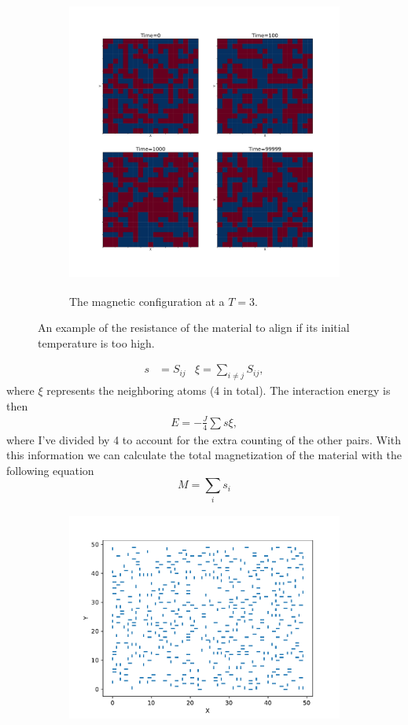 \documentclass{article}
\begin{document}
\begin{enumerate}
{\begin{figure}[h!]
\begin{subfigure}[t]{0.5\textwidth}
        \centering
        \includegraphics[width=\textwidth, height=10cm]{config3.pdf}
        \caption{The magnetic configuration at a $T=3$.}
    \end{subfigure}
    \caption{An example of the resistance of the material to align if its initial temperature is too high.}
    \end{figure}
    \begin{align*}
        s &= S_{ij} & \xi = \sum_{i \neq j}S_{ij},
    \end{align*}
    where $\xi$ represents the neighboring atoms (4 in total). The interaction energy is then
    \begin{equation*}
        \begin{split}
            E = -\frac{J}{4}\sum s \xi,
        \end{split}
    \end{equation*}
    where I've divided by 4 to account for the extra counting of the other pairs. With this information we can calculate the total magnetization of the material with the following equation
    \begin{equation}
        M = \sum_i s_i
    \end{equation}
     \begin{figure}[h!]
    \centering
    \begin{subfigure}[t]{0.3\textwidth}
        \centering
        \includegraphics[width=\textwidth, height=7cm]{dimer100.pdf}

\end{subfigure}
\end{figure}}
\end{enumerate}
\end{document}

